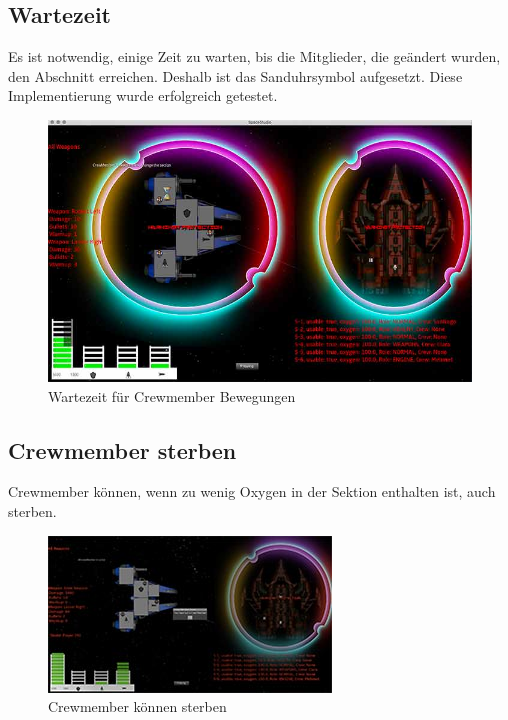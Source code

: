 \documentclass[12pt]{article}
\begin{document}
\subsection{Wartezeit}
Es ist notwendig, einige Zeit zu warten, bis die Mitglieder, die geändert wurden, den Abschnitt erreichen. Deshalb ist das Sanduhrsymbol aufgesetzt. Diese Implementierung wurde erfolgreich getestet.
\begin{figure}[htp]
\centering
\includegraphics[scale=0.6]{TestProtocolBilder/timewaiting@0,25x.jpg}
\caption{Wartezeit für Crewmember Bewegungen}
\end{figure}
\newpage
\subsection{Crewmember sterben}
Crewmember können, wenn zu wenig Oxygen in der Sektion enthalten ist, auch sterben.
\begin{figure}[htp]
	\centering
	\includegraphics[scale=1.5]{TestProtocolBilder/crewMemberDead@0,25x.jpg}
	\caption{Crewmember können sterben}
\end{figure}
\newpage
\end{document}
